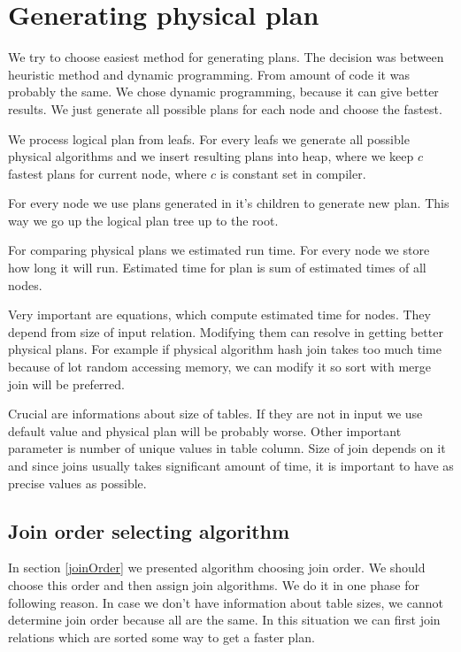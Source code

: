 \section{Generating physical plan}

We try to choose easiest method for generating plans. The decision was between heuristic method and dynamic programming. From amount of code it was probably the same. We chose dynamic programming, because it can give better results. We just generate all possible plans for each node and choose the fastest.

We process logical plan from leafs. For every leafs we generate all possible physical algorithms and we insert resulting plans into heap, where we keep $c$ fastest plans for current node, where $c$ is constant set in compiler.

For every node we use plans generated in it's children to generate new plan. This way we go up the logical plan tree up to the root.

For comparing physical plans we estimated run time. For every node we store how long it will run. Estimated time for plan is sum of estimated times of all nodes.

Very important are equations, which compute estimated time for nodes. They depend from size of input relation. Modifying them can resolve in getting better physical plans. For example if physical algorithm hash join takes too much time because of lot random accessing memory, we can modify it so sort with merge join will be preferred.

Crucial are informations about size of tables. If they are not in input we use default value and physical plan will be probably worse. Other important parameter is number of unique values in table column. Size of join depends on it and since joins usually takes significant amount of time, it is important to have as precise values as possible. 

\subsection{Join order selecting algorithm}


In section \ref{joinOrder} we presented algorithm choosing join order. We should choose this order and then assign join algorithms. We do it in one phase for following reason. In case we don't have information about table sizes, we cannot determine join order because all are the same. In this situation we can first join relations which are sorted some way to get a faster plan.

